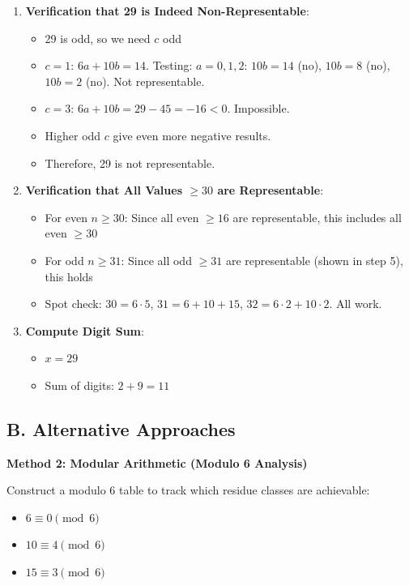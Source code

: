 \documentclass[12pt]{article}
\begin{document}
\begin{solutionbox}
\begin{enumerate}[leftmargin=*]
    \item \textbf{Verification that 29 is Indeed Non-Representable}:
    \begin{itemize}
        \item 29 is odd, so we need $c$ odd
        \item $c = 1$: $6a + 10b = 14$. Testing: $a = 0, 1, 2$: $10b = 14$ (no), $10b = 8$ (no), $10b = 2$ (no). Not representable.
        \item $c = 3$: $6a + 10b = 29 - 45 = -16 < 0$. Impossible.
        \item Higher odd $c$ give even more negative results.
        \item Therefore, 29 is not representable.
    \end{itemize}
    
    \item \textbf{Verification that All Values $\geq 30$ are Representable}:
    \begin{itemize}
        \item For even $n \geq 30$: Since all even $\geq 16$ are representable, this includes all even $\geq 30$
        \item For odd $n \geq 31$: Since all odd $\geq 31$ are representable (shown in step 5), this holds
        \item Spot check: $30 = 6 \cdot 5$, $31 = 6 + 10 + 15$, $32 = 6 \cdot 2 + 10 \cdot 2$. All work.
    \end{itemize}
    
    \item \textbf{Compute Digit Sum}:
    \begin{itemize}
        \item $x = 29$
        \item Sum of digits: $2 + 9 = 11$
    \end{itemize}
\end{enumerate}

\subsection*{B. Alternative Approaches}

\textbf{Method 2: Modular Arithmetic (Modulo 6 Analysis)}

Construct a modulo 6 table to track which residue classes are achievable:
\begin{itemize}
    \item $6 \equiv 0 \pmod{6}$
    \item $10 \equiv 4 \pmod{6}$
    \item $15 \equiv 3 \pmod{6}$
\end{itemize}


\end{solutionbox}
\end{document}
